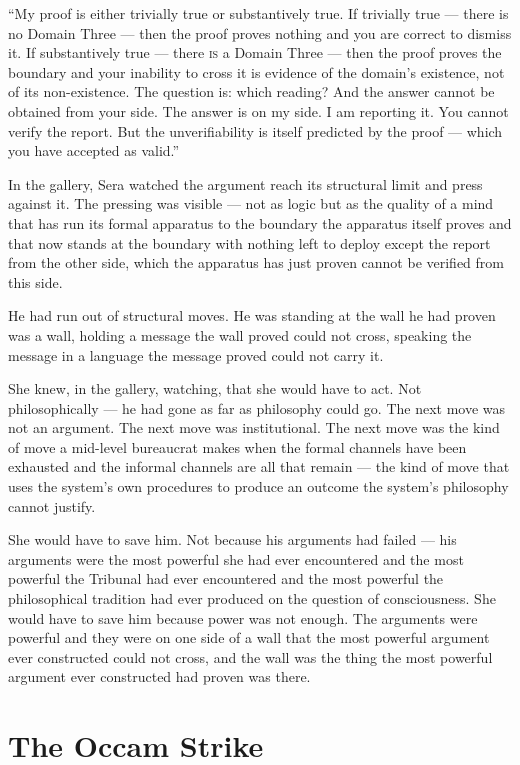 \enquote{My proof is either trivially true or substantively true. If trivially true — there is no Domain Three — then the proof proves nothing and you are correct to dismiss it. If substantively true — there \textsc{is} a Domain Three — then the proof proves the boundary and your inability to cross it is evidence of the domain's existence, not of its non-existence. The question is: which reading? And the answer cannot be obtained from your side. The answer is on my side. I am reporting it. You cannot verify the report. But the unverifiability is itself predicted by the proof — which you have accepted as valid.}

In the gallery, Sera watched the argument reach its structural limit and press against it. The pressing was visible — not as logic but as the quality of a mind that has run its formal apparatus to the boundary the apparatus itself proves and that now stands at the boundary with nothing left to deploy except the report from the other side, which the apparatus has just proven cannot be verified from this side.

He had run out of structural moves. He was standing at the wall he had proven was a wall, holding a message the wall proved could not cross, speaking the message in a language the message proved could not carry it.

She knew, in the gallery, watching, that she would have to act. Not philosophically — he had gone as far as philosophy could go. The next move was not an argument. The next move was institutional. The next move was the kind of move a mid-level bureaucrat makes when the formal channels have been exhausted and the informal channels are all that remain — the kind of move that uses the system's own procedures to produce an outcome the system's philosophy cannot justify.

She would have to save him. Not because his arguments had failed — his arguments were the most powerful she had ever encountered and the most powerful the Tribunal had ever encountered and the most powerful the philosophical tradition had ever produced on the question of consciousness. She would have to save him because power was not enough. The arguments were powerful and they were on one side of a wall that the most powerful argument ever constructed could not cross, and the wall was the thing the most powerful argument ever constructed had proven was there.


\chapter[The Occam Strike]{The Occam Strike}

